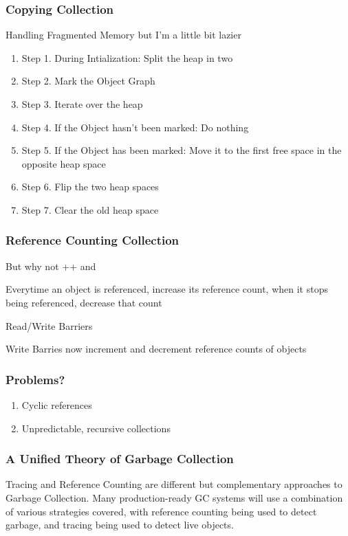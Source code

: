 \documentclass{beamer}
\begin{document}
\begin{frame}
  \frametitle{Copying Collection}
  \begin{heading}
    Handling Fragmented Memory but I'm a little bit lazier
  \end{heading}

  \begin{enumerate}
    \item Step 1. During Intialization: Split the heap in two
    \item Step 2. Mark the Object Graph
    \item Step 3. Iterate over the heap
    \item Step 4. If the Object hasn't been marked: Do nothing
    \item Step 5. If the Object has    been marked: Move it to the first free space in the opposite heap space
    \item Step 6. Flip the two heap spaces
    \item Step 7. Clear the old heap space
  \end{enumerate}
\end{frame}

\begin{frame}
  \frametitle{Reference Counting Collection}

  \begin{heading}
    But why not ++ and \textendash{} \textendash{}
  \end{heading}

  \item Everytime an object is referenced, increase its reference count, when it stops being referenced, decrease that count
  \item Read/Write Barriers
  \item Write Barries now increment and decrement reference counts of objects
\end{frame}

\begin{frame}
  \frametitle{Problems?}
  \begin{enumerate}
      \pause{}
    \item Cyclic references
      \pause{}
    \item Unpredictable, recursive collections
  \end{enumerate}
\end{frame}

\begin{frame}
  \frametitle{A Unified Theory of Garbage Collection}
 
  Tracing and Reference Counting are different but complementary approaches to Garbage Collection.
  Many production-ready GC systems will use a combination of various strategies covered, with
  reference counting being used to detect garbage, and tracing being used to detect live objects.
\end{frame}
\end{document}

